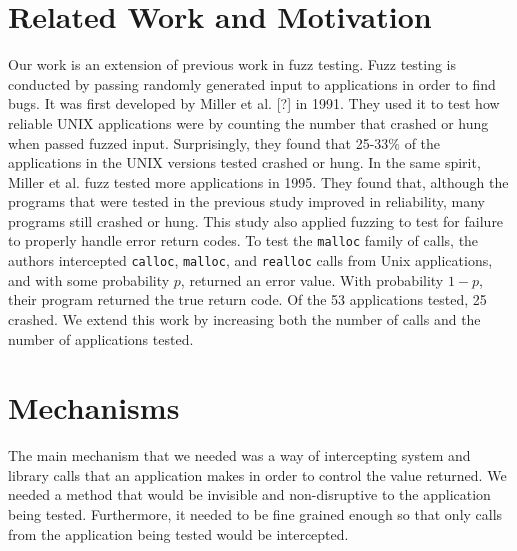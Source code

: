 \documentclass[10pt]{article}
\begin{document}
\section{Related Work and Motivation}
Our work is an extension of previous work in fuzz testing. Fuzz testing is conducted by passing randomly generated input to applications in order to find bugs. It was first developed by Miller et al. [?] in 1991. They used it to test how reliable UNIX applications were by counting the number that crashed or hung when passed fuzzed input. Surprisingly, they found that 25-33\% of the applications in the UNIX versions tested crashed or hung. In the same spirit, Miller et al. \cite{bart} fuzz tested more applications in 1995. They found that, although the programs that were tested in the previous study improved in reliability, many programs still crashed or hung. This study also applied fuzzing to test for failure to properly handle error return codes. To test the \texttt{malloc} family of calls, the authors intercepted \texttt{calloc}, \texttt{malloc}, and \texttt{realloc} calls from Unix applications, and with some probability $p$, returned an error value. With probability $1-p$, their program returned the true return code. Of the 53 applications tested, 25 crashed.  We extend this work by increasing both the number of calls and the number of applications tested.  



\section{Mechanisms}
The main mechanism that we needed was a way of intercepting system and library calls that an application makes in order to control the value returned. We needed a method that would be invisible and non-disruptive to the application being tested. Furthermore, it needed to be fine grained enough so that only calls from the  application being tested would be intercepted.
\end{document}
